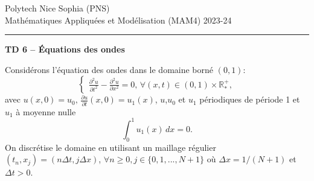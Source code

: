 \documentclass[12pt,a4paper]{article}
\begin{document}
 \hfill Polytech Nice Sophia (PNS)\\
\noindent Math\'ematiques Appliqu\'ees et Mod\'elisation (MAM4)
\hfill 2023-24\\

\hrule

\bigskip
\bigskip

\begin{center}{\bf TD 6 -- \'Equations des ondes} \end{center}

\bigskip

\parskip 12pt
\noindent Consid\'erons l'\'equation des ondes dans le domaine born\'e $(0,1)$:
$$
\begin{cases}
\displaystyle\frac{\partial^2 u}{\partial t^2}-\frac{\partial^2 u}{\partial
  x^2}=0,\, \forall (x,t)\in(0,1)\times\mathbb{R}^+_*,
\end{cases}
$$
avec $u(x, 0) = u_0,\, \displaystyle\frac{\partial u}{\partial t}(x,0)=u_1(x)$,
$u$,$u_0$ et $u_1$ p\'eriodiques de p\'eriode 1 et $u_1$ \`a moyenne nulle
$$
\int_0^1 u_1(x)\,dx =0.
$$
On discr\'etise le domaine en utilisant un maillage r\'egulier
$(t_n,x_j)=(n\Delta t,j\Delta x)$,  $\forall n\ge 0,
j\in\{0,1,...,N+1\}$ o\`u $\Delta x=1/(N+1)$ et $\Delta t>0$.\\
\end{document}
